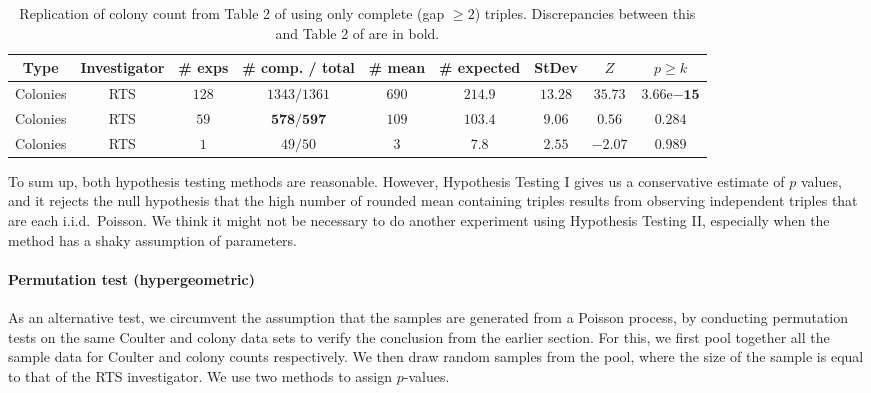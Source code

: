 \documentclass[11pt]{article}
\newcommand{\expnum}[2]{{#1}\mathrm{e}{#2}}
\begin{document}
\begin{table}[htbp]
\begin{center}
\begin{scriptsize}
\bgroup
\def\arraystretch{1.5} %
\begin{tabular}{*{9}{c}}
\hline
Type & Investigator & \# exps & \# comp. / total & \# mean & \# expected & StDev & $Z$ & $p \geq k$ \\
\hline
Colonies & RTS & $128$ & $1343/1361$ & $690$ & $\bm{214.9}$ & $\bm{13.28}$ & $\bm{35.73}$ & $\bm{\expnum{3.66}{-15}}$ \\

Colonies & RTS & $59$ & $\bm{578/597}$ & $109$ & $\bm{103.4}$ & $\bm{9.06}$ & $\bm{0.56}$ & $\bm{0.284}$ \\

Colonies & RTS & $1$ & $49/50$ & $3$ & $\bm{7.8}$ & $\bm{2.55}$ & $\bm{-2.07}$ & $\bm{0.989}$ \\
\hline
\end{tabular}
\egroup
\end{scriptsize}
\end{center}
\caption{Replication of colony count from Table 2 of \citet{Pitt:2016cu} using only complete (gap $\ge 2$) triples. Discrepancies between this and Table 2 of \citet{Pitt:2016cu} are in bold.}
\label{tbl:table2}
\end{table}

To sum up, both hypothesis testing methods are reasonable. However, Hypothesis Testing I gives us a conservative estimate of $p$ values, and it rejects the null hypothesis that the high number of rounded mean containing triples results from observing independent triples that are each i.i.d.\ Poisson. We think it might not be necessary to do another experiment using Hypothesis Testing II, especially when the method has a shaky assumption of parameters.

\paragraph{Permutation test (hypergeometric)} As an alternative test, we circumvent the assumption that the samples are generated from a Poisson process, by conducting permutation tests on the same Coulter and colony data sets to verify the conclusion from the earlier section. For this, we first pool together all the sample data for Coulter and colony counts respectively. We then draw random samples from the pool, where the size of the sample is equal to that of the RTS investigator. We use two methods to assign $p$-values. 
\end{document}
